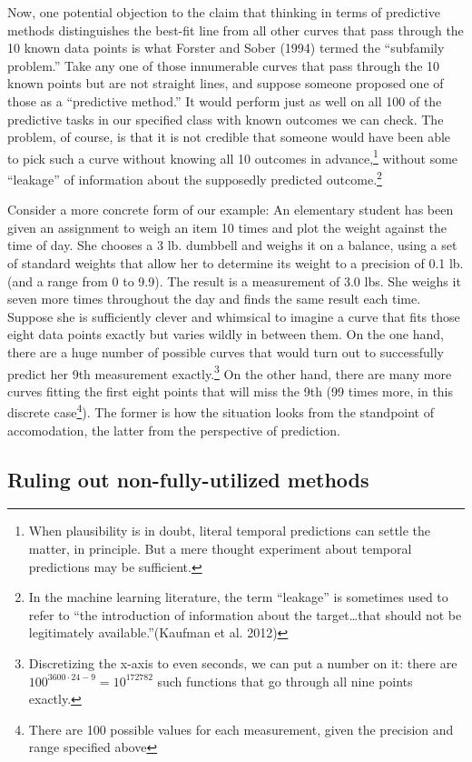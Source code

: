 \documentclass[
  letterpaper,
  DIV=11,
  numbers=noendperiod]{scrartcl}
\theoremstyle{definition}
\theoremstyle{remark}
\begin{document}
Now, one potential objection to the claim that thinking in terms of
predictive methods distinguishes the best-fit line from all other curves
that pass through the 10 known data points is what Forster and Sober
(1994) termed the ``subfamily problem.'' Take any one of those
innumerable curves that pass through the 10 known points but are not
straight lines, and suppose someone proposed one of those as a
``predictive method.'' It would perform just as well on all 100 of the
predictive tasks in our specified class with known outcomes we can
check. The problem, of course, is that it is not credible that someone
would have been able to pick such a curve without knowing all 10
outcomes in advance,\footnote{When plausibility is in doubt, literal
  temporal predictions can settle the matter, in principle. But a mere
  thought experiment about temporal predictions may be sufficient.}
without some ``leakage'' of information about the supposedly predicted
outcome.\footnote{In the machine learning literature, the term
  ``leakage'' is sometimes used to refer to ``the introduction of
  information about the target\ldots that should not be legitimately
  available.''(Kaufman et al. 2012)}

Consider a more concrete form of our example: An elementary student has
been given an assignment to weigh an item 10 times and plot the weight
against the time of day. She chooses a 3 lb. dumbbell and weighs it on a
balance, using a set of standard weights that allow her to determine its
weight to a precision of 0.1 lb. (and a range from 0 to 9.9). The result
is a measurement of 3.0 lbs. She weighs it seven more times throughout
the day and finds the same result each time. Suppose she is sufficiently
clever and whimsical to imagine a curve that fits those eight data
points exactly but varies wildly in between them. On the one hand, there
are a huge number of possible curves that would turn out to successfully
predict her 9th measurement exactly.\footnote{Discretizing the x-axis to
  even seconds, we can put a number on it: there are
  \(100^{3600 \cdot 24 - 9}=10^{172782}\) such functions that go through
  all nine points exactly.} On the other hand, there are many more
curves fitting the first eight points that will miss the 9th (99 times
more, in this discrete case\footnote{There are 100 possible values for
  each measurement, given the precision and range specified above}). The
former is how the situation looks from the standpoint of accomodation,
the latter from the perspective of prediction.

\subsection{Ruling out non-fully-utilized
methods}\label{ruling-out-non-fully-utilized-methods}
\end{document}
